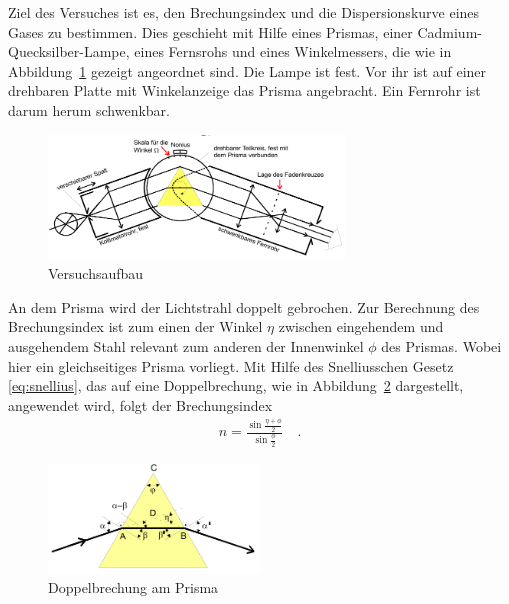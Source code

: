 Ziel des Versuches ist es, den Brechungsindex und die Dispersionskurve eines Gases zu bestimmen.
Dies geschieht mit Hilfe eines Prismas, einer Cadmium-Quecksilber-Lampe, eines Fernsrohs und eines Winkelmessers, die wie in Abbildung~\ref{fig:aufbau} gezeigt angeordnet sind. Die Lampe ist fest. Vor ihr ist auf einer drehbaren Platte mit Winkelanzeige das Prisma angebracht. Ein Fernrohr ist darum herum schwenkbar. \\

\begin{figure}[h!]
	\centering
	\includegraphics[width=0.7\textwidth]{Aufbau.png}
	\caption{Versuchsaufbau}
	\label{fig:aufbau}
\end{figure}

An dem Prisma wird der Lichtstrahl doppelt gebrochen. Zur Berechnung des Brechungsindex ist zum einen der Winkel  $\eta$ zwischen eingehendem und ausgehendem Stahl relevant zum anderen der Innenwinkel $\phi$ des Prismas. Wobei hier ein gleichseitiges Prisma vorliegt. Mit Hilfe des Snelliusschen Gesetz \eqref{eq:snellius}, das auf eine Doppelbrechung, wie in Abbildung~\ref{fig:prisma1} dargestellt, angewendet wird, folgt der Brechungsindex
\begin{align}\label{BrechIndex}
	n=\frac{\sin\frac{\eta + \phi}{2}}{\sin\frac{\phi}{2}} \quad .
\end{align}

\begin{figure}[h!]
	\centering
	\includegraphics[width=0.5\textwidth]{Prisma1.png}
	\caption{Doppelbrechung am Prisma}
	\label{fig:prisma1}
\end{figure}

\clearpage

